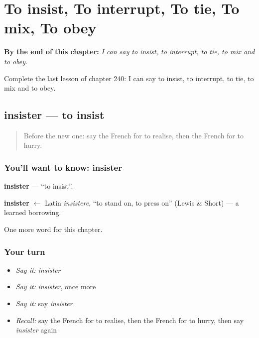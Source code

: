 
\chapter{To insist, To interrupt, To tie, To mix, To obey}
\label{ch:fr-to-insist-to-interrupt-to-tie-to-mix-to-obey}

\begin{chapteropening}
\textbf{By the end of this chapter:} \emph{I can say to insist, to interrupt, to tie, to mix and to obey.}

Complete the last lesson of chapter 240: I can say to insist, to interrupt, to tie, to mix and to obey.
\end{chapteropening}

\section[insister]{insister — to insist}

\label{lesson:FR-C240-insister}



\begin{quote}
Before the new one: say the French for to realise, then the French for to hurry.
\end{quote}

\subsection*{You'll want to know: insister}
\textbf{insister} — \textquotedblleft{}to insist\textquotedblright{}.

\begin{cousinweb}
\textbf{insister} $\leftarrow$ Latin \emph{insistere}, \textquotedblleft{}to stand on, to press on\textquotedblright{} (Lewis \& Short) — a learned borrowing.
\end{cousinweb}

\begin{grammarlens}[title={What you've built}]
One more word for this chapter.
\end{grammarlens}

\subsection*{Your turn}
\begin{itemize}
\raggedright
  \item \emph{Say it:} \emph{insister}
  \item \emph{Say it:} \emph{insister}, once more
  \item \emph{Say it:} say \emph{insister}
  \item \emph{Recall:} say the French for to realise, then the French for to hurry, then say \emph{insister} again
\end{itemize}

